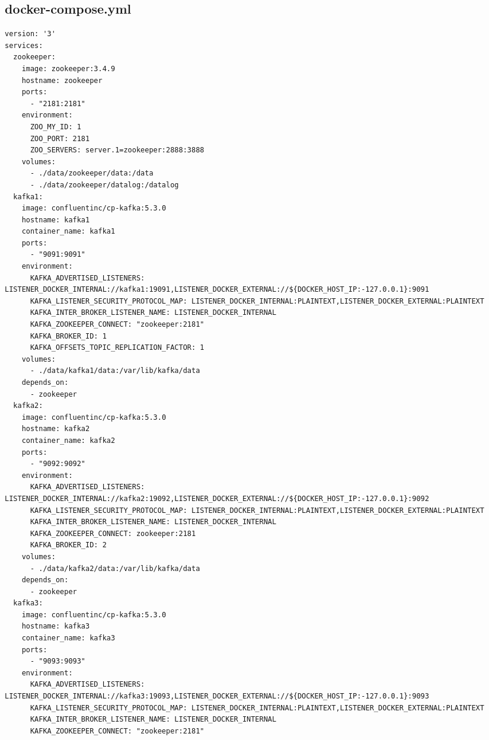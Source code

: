 \documentclass[11pt]{article}
\begin{document}
\begin{appendices}
\section*{docker-compose.yml}

\begin{adjustwidth}{-120pt}{100pt}
\begin{scriptsize}
\begin{verbatim}
version: '3'
services:
  zookeeper:
    image: zookeeper:3.4.9
    hostname: zookeeper
    ports:
      - "2181:2181"
    environment:
      ZOO_MY_ID: 1
      ZOO_PORT: 2181
      ZOO_SERVERS: server.1=zookeeper:2888:3888
    volumes:
      - ./data/zookeeper/data:/data
      - ./data/zookeeper/datalog:/datalog
  kafka1:
    image: confluentinc/cp-kafka:5.3.0
    hostname: kafka1
    container_name: kafka1
    ports:
      - "9091:9091"
    environment:
      KAFKA_ADVERTISED_LISTENERS: LISTENER_DOCKER_INTERNAL://kafka1:19091,LISTENER_DOCKER_EXTERNAL://${DOCKER_HOST_IP:-127.0.0.1}:9091
      KAFKA_LISTENER_SECURITY_PROTOCOL_MAP: LISTENER_DOCKER_INTERNAL:PLAINTEXT,LISTENER_DOCKER_EXTERNAL:PLAINTEXT
      KAFKA_INTER_BROKER_LISTENER_NAME: LISTENER_DOCKER_INTERNAL
      KAFKA_ZOOKEEPER_CONNECT: "zookeeper:2181"
      KAFKA_BROKER_ID: 1
      KAFKA_OFFSETS_TOPIC_REPLICATION_FACTOR: 1
    volumes:
      - ./data/kafka1/data:/var/lib/kafka/data
    depends_on:
      - zookeeper
  kafka2:
    image: confluentinc/cp-kafka:5.3.0
    hostname: kafka2
    container_name: kafka2
    ports:
      - "9092:9092"
    environment:
      KAFKA_ADVERTISED_LISTENERS: LISTENER_DOCKER_INTERNAL://kafka2:19092,LISTENER_DOCKER_EXTERNAL://${DOCKER_HOST_IP:-127.0.0.1}:9092
      KAFKA_LISTENER_SECURITY_PROTOCOL_MAP: LISTENER_DOCKER_INTERNAL:PLAINTEXT,LISTENER_DOCKER_EXTERNAL:PLAINTEXT
      KAFKA_INTER_BROKER_LISTENER_NAME: LISTENER_DOCKER_INTERNAL
      KAFKA_ZOOKEEPER_CONNECT: zookeeper:2181
      KAFKA_BROKER_ID: 2
    volumes:
      - ./data/kafka2/data:/var/lib/kafka/data
    depends_on:
      - zookeeper 
  kafka3:
    image: confluentinc/cp-kafka:5.3.0
    hostname: kafka3
    container_name: kafka3
    ports:
      - "9093:9093"
    environment:
      KAFKA_ADVERTISED_LISTENERS: LISTENER_DOCKER_INTERNAL://kafka3:19093,LISTENER_DOCKER_EXTERNAL://${DOCKER_HOST_IP:-127.0.0.1}:9093
      KAFKA_LISTENER_SECURITY_PROTOCOL_MAP: LISTENER_DOCKER_INTERNAL:PLAINTEXT,LISTENER_DOCKER_EXTERNAL:PLAINTEXT
      KAFKA_INTER_BROKER_LISTENER_NAME: LISTENER_DOCKER_INTERNAL
      KAFKA_ZOOKEEPER_CONNECT: "zookeeper:2181"

\end{verbatim}
\end{scriptsize}
\end{adjustwidth}
\end{appendices}
\end{document}
